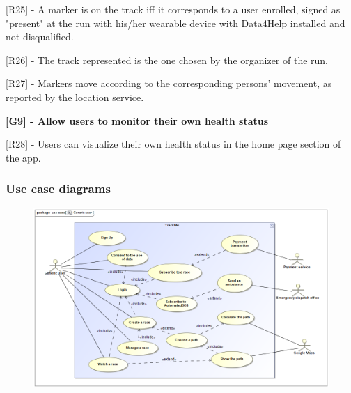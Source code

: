 [R25] - A marker is on the track iff it corresponds to a user enrolled, signed as "present" at the run with his/her wearable device with Data4Help installed and not disqualified. \newline

[R26] - The track represented is the one chosen by the organizer of the run. \newline

[R27] - Markers move according to the corresponding persons' movement, as reported by the location service. \newline

\hspace{-\parindent}\textbf{[G9] - Allow users to monitor their own health status} \newline

[R28] - Users can visualize their own health status in the home page section of the app. \newline
\newpage

\subsubsection{Use case diagrams}
\begin{figure}[h!]
\centering
\includegraphics[scale=0.43]{sections/diagrams/Generic_user.png} \newline
{}
\end{figure}

